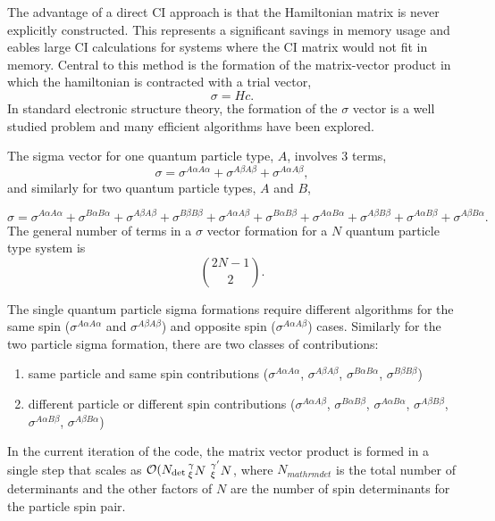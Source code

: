 The advantage of a direct CI approach is that the Hamiltonian matrix is never explicitly constructed.
This represents a significant savings in memory usage and eables large CI calculations for systems where the CI matrix would not fit in memory. Central to this method is the formation of the matrix-vector product in which the hamiltonian is contracted with a trial vector,
\begin{equation}
    \sigma = H c.
\end{equation}
In standard electronic structure theory, the formation of the $\sigma$ vector is a well studied problem and many efficient algorithms have been explored.\citehere

The sigma vector for one quantum particle type, $A$, involves 3 terms,
\begin{equation}
    \sigma = 
    \sigma^{A \alpha A \alpha} +
    \sigma^{A \beta A \beta} +
    \sigma^{A \alpha A \beta},
\end{equation}
and similarly for two quantum particle types, $A$ and $B$, 

\begin{equation}
    \sigma = 
    \sigma^{A \alpha A \alpha} +
    \sigma^{B \alpha B \alpha} +
    \sigma^{A \beta A \beta} +
    \sigma^{B \beta B \beta} +
    \sigma^{A \alpha A \beta} +
    \sigma^{B \alpha B \beta} +
    \sigma^{A \alpha B \alpha} +
    \sigma^{A \beta B \beta} +
    \sigma^{A \alpha B \beta} +
    \sigma^{A \beta B \alpha}.
\end{equation}
The general number of terms in a $\sigma$ vector formation for a $N$ quantum particle type system is 
\begin{equation}
    \binom{2N -1}{2}.
\end{equation}

The single quantum particle sigma formations require different algorithms for the same spin ($\sigma^{A\alpha A\alpha}$ and $\sigma^{A\beta A\beta}$) and opposite spin ($\sigma^{A\alpha A\beta}$) cases.
Similarly for the two particle sigma formation, there are two classes of contributions:
\begin{enumerate}
    \item same particle and same spin contributions ($\sigma^{A\alpha A\alpha}$, $\sigma^{A\beta A\beta}$, $\sigma^{B\alpha B\alpha}$, $\sigma^{B\beta B\beta}$)
    \item different particle or different spin contributions ($\sigma^{A\alpha A\beta}$, $\sigma^{B\alpha B\beta}$, $\sigma^{A\alpha B\alpha}$, $\sigma^{A\beta B\beta}$, $\sigma^{A\alpha B\beta}$, $\sigma^{A\beta B\alpha}$)
\end{enumerate}
In the current iteration of the code, the matrix vector product is formed in a single step that scales as $\mathcal{O}(N_{\mathrm{det}}\sideset{^{\gamma}_{\xi}}{^{}_{}}{\mathop{N}} \sideset{^{\gamma'}_{\xi}}{^{}_{}}{\mathop{N}}$, where $N_{mathrm{det}}$ is the total number of determinants and the other factors of $N$ are the number of spin determinants for the particle spin pair.

